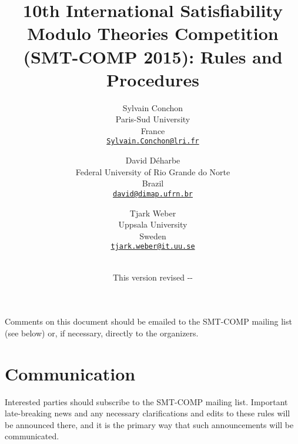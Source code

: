 \documentclass[12pt]{article}
\begin{document}
\date{\small This version revised \the\year-\the\month-\the\day}

\title{10th International Satisfiability Modulo Theories Competition
  (SMT-COMP 2015): Rules and Procedures}

\def\doauthor#1{{%
  \hsize.5\hsize \advance\hsize by-1cm %
  \def\\{\hss\egroup\hbox to\hsize\bgroup\strut\hss}%
  \vbox{\hbox to\hsize\bgroup\strut\hss#1\hss\egroup}}}%

\def\header#1{\medskip\noindent\textbf{#1}}

\author{%
Sylvain Conchon \\
Paris-Sud University \\
France \\
{\small\href{mailto:Sylvain.Conchon@lri.fr}{\tt Sylvain.Conchon@lri.fr}} \\
\and
David D{\'e}harbe \\
Federal University of Rio Grande do Norte \\
Brazil \\
{\small\href{mailto:david@dimap.ufrn.br}{\tt david@dimap.ufrn.br}} \\
\and
Tjark Weber \\
Uppsala University \\
Sweden \\
{\small\href{mailto:tjark.weber@it.uu.se}{\tt tjark.weber@it.uu.se}} \\
\\
}

\maketitle

\noindent Comments on this document should be emailed to the SMT-COMP
mailing list (see below) or, if necessary, directly to the organizers.


\section{Communication}

Interested parties should subscribe to the SMT-COMP mailing list.
Important late-breaking news and any necessary clarifications and
edits to these rules will be announced there, and it is the primary
way that such announcements will be communicated.
\end{document}
